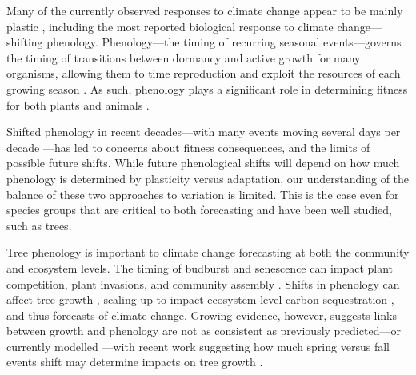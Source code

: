 \documentclass[12pt]{article}
\begin{document}
Many of the currently observed responses to climate change appear to be mainly plastic \citep{burton22,zettle21,bonamour19, king17}, including the most reported biological response to climate change---shifting phenology. Phenology---the timing of recurring seasonal events---governs the timing of transitions between dormancy and active growth for many organisms, allowing them to time reproduction and exploit the resources of each growing season \citep{chuine10,hanninen11,rytteri21,posle18}. As such, phenology plays a significant role in determining fitness for both plants \citep{guo22,chuine01} and animals \citep{wann19,renner18,chu17}. 

Shifted phenology in recent decades---with many events moving several days per decade \citep{vita21,khar18,Menzel06}---has led to concerns about fitness consequences, and the limits of possible future shifts. While future phenological shifts will depend on how much phenology is determined by plasticity versus adaptation, our understanding of the balance of these two approaches to variation is limited. This is the case even for species groups that are critical to both forecasting and have been well studied, such as trees. 

Tree phenology is important to climate change forecasting at both the community and ecosystem levels. The timing of budburst and senescence can impact plant competition, plant invasions, and community assembly \citep{fridley12}. Shifts in phenology can affect tree growth \citep{myneni97}, scaling up to impact ecosystem-level carbon sequestration \citep{Barichivich12}, and thus forecasts of climate change. Growing evidence, however, suggests links between growth and phenology are not as consistent as previously predicted---or currently modelled \citep{dow22}---with recent work suggesting how much spring versus fall events shift may determine impacts on tree growth \citep{zohner23}. 
\end{document}
